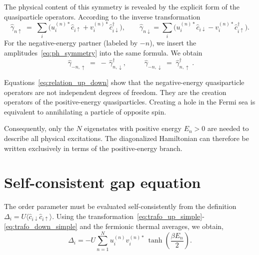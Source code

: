 \documentclass[11pt,a4paper,twoside,openany]{report}
\begin{document}
The physical content of this symmetry is revealed by the explicit form of the quasiparticle operators.  According to the inverse transformation
\begin{equation}
  \hat{\gamma}_{n\uparrow} \;=\; \sum_i \bigl( u_i^{(n)*} \hat{c}_{i\uparrow} + v_i^{(n)*} \hat{c}_{i\downarrow}^\dagger \bigr),\qquad\hat{\gamma}_{n\downarrow} = \sum_i \bigl( u_i^{(n)*} \hat{c}_{i\downarrow} -v_i^{(n)*} \hat{c}_{i\uparrow}^\dagger \bigr).
  \label{eq:gamma_n}
\end{equation}
For the negative-energy partner (labeled by \(-n\)), we insert the amplitudes~\eqref{eq:ph_symmetry} into the same formula. We obtain
\begin{equation}
  \boxed{\;\hat{\gamma}_{-n,\uparrow} \;=\; -\,\hat{\gamma}_{n,\downarrow}^\dagger,\;\qquad\;\hat{\gamma}_{-n,\downarrow} \;=\; \hat{\gamma}_{n,\uparrow}^\dagger\;}.
  \label{eq:relation_up_down}
\end{equation}

Equations~\eqref{eq:relation_up_down} show that the negative-energy quasiparticle operators are not independent degrees of freedom. They are the creation operators of the positive-energy quasiparticles. Creating a hole in the Fermi sea is equivalent to annihilating a particle of opposite spin.

Consequently, only the $N$ eigenstates with positive energy \(E_n>0\) are needed to describe all physical excitations.  The diagonalized Hamiltonian can therefore be written exclusively in terms of the positive-energy branch.










\section{Self-consistent gap equation}
\label{sec:self consistent gap eq}
The order parameter must be evaluated self-consistently from the definition \(\Delta_{i} = U\langle \hat{c}_{i\downarrow} \hat{c}_{i\uparrow}\rangle\). Using the transformation~\eqref{eq:trafo_up_simple}-\eqref{eq:trafo_down_simple} and the fermionic thermal averages, we obtain,
\begin{equation}
  \boxed{
    \Delta_{i} = -U \sum_{n=1}^N u_{i}^{(n)} v_{i}^{(n)*} \,
                \tanh\!\left( \frac{\beta E_{n}}{2} \right) .
  }
  \label{eq:Delta_sum_all}
\end{equation}
\end{document}
